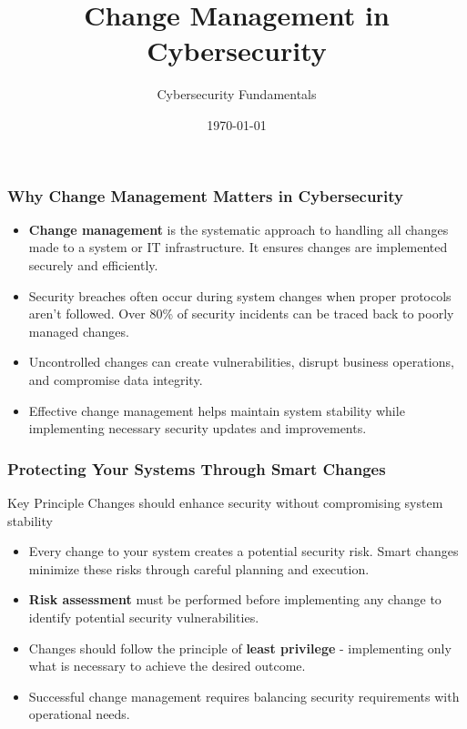 \documentclass{beamer}
\title{Change Management in Cybersecurity}
\author{Cybersecurity Fundamentals}
\date{\today}
\begin{document}
\begin{frame}
\titlepage
\end{frame}

\begin{frame}
\frametitle{Why Change Management Matters in Cybersecurity}
\begin{itemize}
    \item \textbf{Change management} is the systematic approach to handling all changes made to a system or IT infrastructure. It ensures changes are implemented securely and efficiently.
    
    \item Security breaches often occur during system changes when proper protocols aren't followed. Over 80\% of security incidents can be traced back to poorly managed changes.
    
    \item Uncontrolled changes can create vulnerabilities, disrupt business operations, and compromise data integrity.
    
    \item Effective change management helps maintain system stability while implementing necessary security updates and improvements.
\end{itemize}
\end{frame}

\begin{frame}
\frametitle{Protecting Your Systems Through Smart Changes}
\begin{alertblock}{Key Principle}
Changes should enhance security without compromising system stability
\end{alertblock}
\begin{itemize}
    \item Every change to your system creates a potential security risk. Smart changes minimize these risks through careful planning and execution.
    
    \item \textbf{Risk assessment} must be performed before implementing any change to identify potential security vulnerabilities.
    
    \item Changes should follow the principle of \textbf{least privilege} - implementing only what is necessary to achieve the desired outcome.
    
    \item Successful change management requires balancing security requirements with operational needs.
\end{itemize}
\end{frame}
\end{document}
